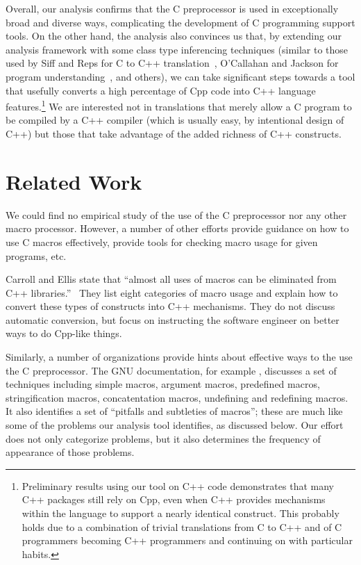 Overall, our analysis confirms that the C preprocessor is used in
exceptionally broad and diverse ways, complicating the development of
C programming support tools.  On the other hand, the analysis also
convinces us that, by extending our analysis framework with some class
type inferencing techniques (similar to those used by Siff and Reps
for C to C++ translation~\cite{Siff-fse96}, O'Callahan and Jackson for
program understanding~\cite{OCallahan-icse97}, and others), we can
take significant steps towards a tool that usefully converts a high
percentage of Cpp code into C++ language
features.\footnote{Preliminary results using our tool on C++ code
demonstrates that many C++ packages still rely on Cpp, even when C++
provides mechanisms within the language to support a nearly identical
construct.  This probably holds due to a combination of trivial
translations from C to C++ and of C programmers becoming C++
programmers and continuing on with particular habits.}  We are
interested not in translations that merely allow a C program to be
compiled by a C++ compiler (which is usually easy, by intentional
design of C++) but those that take advantage of the added richness of C++
constructs.


\section{Related Work}\label{sec:related}

We could find no empirical study of the use of the C preprocessor nor
any other macro processor.  However, a number of other efforts provide
guidance on how to use C macros effectively, provide tools for
checking macro usage for given programs, etc.

Carroll and Ellis state that ``almost all uses of macros can be
eliminated from C++ libraries.''~\cite[p.146]{Carroll95} 
They list eight categories of macro usage and explain how to convert
these types of constructs into C++ mechanisms.  They do not
discuss automatic conversion, but  focus on instructing the
software engineer on better ways to do Cpp-like things.

Similarly, a number of organizations provide hints about effective
ways to the use the C preprocessor.  The GNU documentation, for example ,
discusses a set of techniques including simple macros, argument
macros, predefined macros, stringification macros, concatentation
macros, undefining and redefining
macros.
It also identifies a set of ``pitfalls and subtleties of
macros''; these are much like some of the problems our analysis tool
identifies, as discussed below.  Our effort does not only categorize
problems, but it also determines the frequency of appearance of those
problems. 

